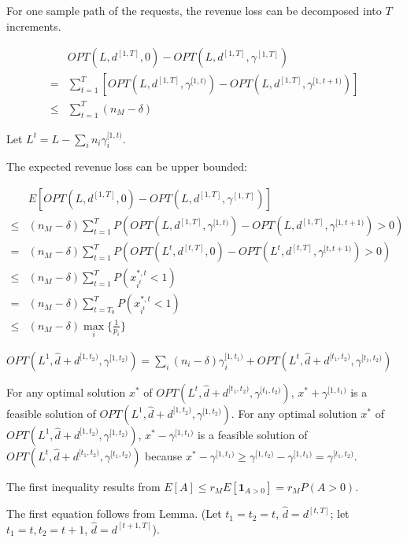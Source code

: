 For one sample path of the requests, the revenue loss can be decomposed into $T$ increments.

\begin{align*}
    & OPT(L, d^{[1, T]}, 0) - OPT(L, d^{[1, T]}, \gamma^{[1, T]}) \\
 = & \sum_{t=1}^{T} [OPT(L, d^{[1,T]}, \gamma^{[1,t)}) - OPT(L, d^{[1,T]}, \gamma^{[1,t+1)})] \\
 \leq & \sum_{t=1}^{T} (n_{M} - \delta)
\end{align*}

Let $L^{t} = L-\sum_{i}n_{i} \gamma_{i}^{[1,t)}$.

The expected revenue loss can be upper bounded:

\begin{align*}
    & E[OPT(L, d^{[1, T]}, 0) - OPT(L, d^{[1, T]}, \gamma^{[1, T]})] \\
 \leq & (n_{M} - \delta) \sum_{t=1}^{T} P(OPT(L, d^{[1, T]}, \gamma^{[1,t)}) - OPT(L, d^{[1, T]}, \gamma^{[1,t+1)}) > 0) \\
 = & (n_{M} - \delta) \sum_{t=1}^{T} P(OPT(L^{t}, d^{[t, T]}, 0) - OPT(L^{t}, d^{[t, T]}, \gamma^{[t,t+1)}) > 0) \\
 \leq & (n_{M} - \delta) \sum_{t=1}^{T} P(x_{i^{t}}^{*,t} <1) \\
 = & (n_{M} - \delta) \sum_{t=T_{0}}^{T} P(x_{i^{t}}^{*,t} <1) \\
 \leq & (n_{M} - \delta) \max_{i}\{\frac{1}{p_{i}}\} 
\end{align*}


\begin{lem}
$OPT(L^{1}, \hat{d} + d^{[1, t_2)} , \gamma^{[1, t_2)}) = \sum_{i} (n_{i} - \delta) \gamma_{i}^{[1, t_1)} + OPT(L^{t}, \hat{d}+d^{[t_1, t_2)}, \gamma^{[t_1, t_2)})$
\end{lem}

For any optimal solution $x^{*}$ of $OPT(L^{t}, \hat{d}+d^{[t_1, t_2)}, \gamma^{[t_1, t_2)})$, $x^{*} + \gamma^{[1, t_1)}$ is a feasible solution of $OPT(L^{1}, \hat{d}+d^{[1, t_2)}, \gamma^{[1, t_2)})$. For any optimal solution $x^{*}$ of $OPT(L^{1}, \hat{d}+d^{[1, t_2)}, \gamma^{[1, t_2)})$, $x^{*}- \gamma^{[1, t_1)}$ is a feasible solution of $OPT(L^{t}, \hat{d}+d^{[t_1, t_2)}, \gamma^{[t_1, t_2)})$ because $x^{*}- \gamma^{[1, t_1)} \geq \gamma^{[1, t_{2})}- \gamma^{[1, t_1)} = \gamma^{[t_1, t_2)}$.


The first inequality results from $E[A] \leq r_{M} E[\bm{1}_{A>0}] = r_{M} P(A>0)$.

The first equation follows from Lemma. (Let $t_1 = t_2 = t$, $\hat{d} = d^{[t, T]}$; let $t_1 = t, t_2 = t+1$, $\hat{d} = d^{[t+1, T]}$).

